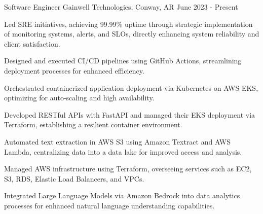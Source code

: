 


\begin{cventries}


\cventry
{Software Engineer} %
{Gainwell Technologies, Conway, AR} %
{} %
{June 2023 - Present} %
{ %
\begin{cvitems}
\item {Led SRE initiatives, achieving 99.99\% uptime through strategic implementation of monitoring systems, alerts, and SLOs, directly enhancing system reliability and client satisfaction.}
\item {Designed and executed CI/CD pipelines using GitHub Actions, streamlining deployment processes for enhanced efficiency.}
\item {Orchestrated containerized application deployment via Kubernetes on AWS EKS, optimizing for auto-scaling and high availability.}
\item {Developed RESTful APIs with FastAPI and managed their EKS deployment via Terraform, establishing a resilient container environment.}
\item {Automated text extraction in AWS S3 using Amazon Textract and AWS Lambda, centralizing data into a data lake for improved access and analysis.}
\item {Managed AWS infrastructure using Terraform, overseeing services such as EC2, S3, RDS, Elastic Load Balancers, and VPCs.}
\item {Integrated Large Language Models via Amazon Bedrock into data analytics processes for enhanced natural language understanding capabilities.}
\end{cvitems}
}






\end{cventries}
